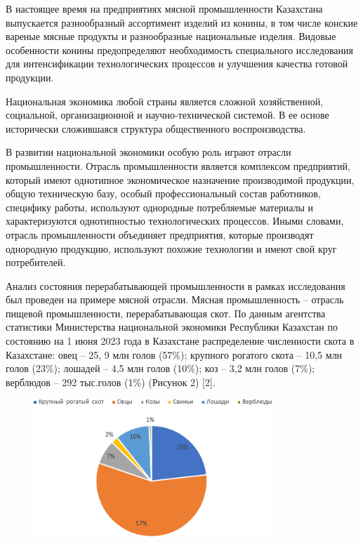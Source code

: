 В настоящее время на предприятиях мясной промышленности Казахстана
выпускается разнообразный ассортимент изделий из конины, в том числе
конские вареные мясные продукты и разнообразные национальные изделия.
Видовые особенности конины предопределяют необходимость специального
исследования для интенсификации технологических процессов и улучшения
качества готовой продукции.

Национальная экономика любой страны является сложной хозяйственной,
социальной, организационной и научно-технической системой. В ее основе
исторически сложившаяся структура общественного воспроизводства.

В развитии национальной экономики особую роль играют отрасли
промышленности. Отрасль промышленности является комплексом предприятий,
который имеют однотипное экономическое назначение производимой
продукции, общую техническую базу, особый профессиональный состав
работников, специфику работы, используют однородные потребляемые
материалы и характеризуются однотипностью технологических процессов.
Иными словами, отрасль промышленности объединяет предприятия, которые
производят однородную продукцию, используют похожие технологии и имеют
свой круг потребителей.

Анализ состояния перерабатывающей промышленности в рамках исследования
был проведен на примере мясной отрасли. Мясная промышленность -- отрасль
пищевой промышленности, перерабатывающая скот. По данным агентства
статистики Министерства национальной экономики Республики Казахстан по
состоянию на 1 июня 2023 года в Казахстане распределение численности
скота в Казахстане: овец -- 25, 9 млн голов (57\%); крупного рогатого
скота -- 10,5 млн голов (23\%); лошадей -- 4,5 млн голов (10\%); коз --
3,2 млн голов (7\%); верблюдов -- 292 тыс.голов (1\%) (Рисунок 2)
{[}2{]}.

\begin{figure}[H]
	\centering
	\includegraphics[width=0.8\textwidth]{assets/307}
	\caption*{}
\end{figure}

